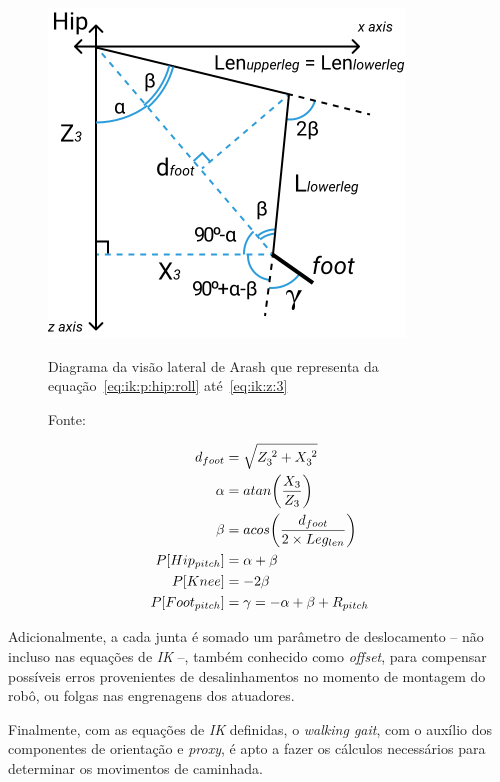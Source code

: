 \begin{figure}[htb]
	\centering
	\includegraphics[scale=1.5]{imagens/svg/inverse-kinematics-sideview}
	\caption{Diagrama da visão lateral de Arash que representa da equação~\ref{eq:ik:p:hip:roll} até~\ref{eq:ik:z:3}}
	\caption*{Fonte: \cite{karimionline}}
	\label{fig:ik:sideview}
\end{figure}

\begin{align}
	       d_{foot} &= \sqrt{Z_3^{\hspace{1mm}2} + X_3^{\hspace{1mm}2}}     \label{eq:ik:d:foot}        \\
	         \alpha &= atan\bigg(\dfrac{X_3}{Z_3}\bigg)                      \label{eq:ik:alpha}         \\
	          \beta &= acos\bigg(\dfrac{d_{foot}}{2 \times Leg_{len}}\bigg)   \label{eq:ik:beta}          \\
	 P[Hip_{pitch}] &= \alpha + \beta                                          \label{eq:ik:p:hip:pitch}   \\
	        P[Knee] &= -2 \beta                                                 \label{eq:ik:p:knee}        \\
	P[Foot_{pitch}] &= \gamma = -\alpha + \beta + R_{pitch}                      \label{eq:ik:p:foot:pitch}
\end{align}

Adicionalmente, a cada junta é somado um parâmetro de deslocamento -- não incluso nas equações de \textit{IK} --, também conhecido como \textit{offset}, para compensar possíveis erros provenientes de desalinhamentos no momento de montagem do robô, ou folgas nas engrenagens dos atuadores.

Finalmente, com as equações de \textit{IK} definidas, o \textit{walking gait}, com o auxílio dos componentes de orientação e \textit{proxy}, é apto a fazer os cálculos necessários para determinar os movimentos de caminhada.
